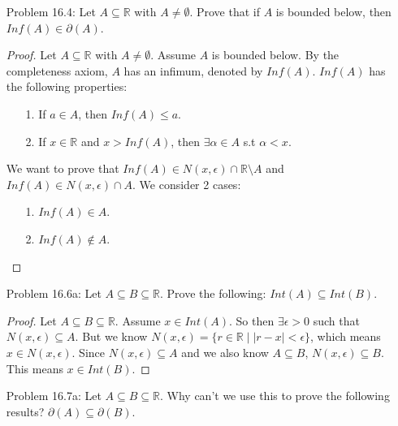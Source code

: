 \documentclass{article}
\theoremstyle{claim}
\theoremstyle{definition}
\begin{document}
\begin{enumerate}
\begin{enumerate}
\begin{proof}
                \end{proof}
            \item $Int(A) \subseteq A'$.
        \end{enumerate}
    \item[Problem 16.4:] Let $A \subseteq \mathbb{R}$ with $A \ne \emptyset$. Prove that if $A$ is bounded below, then $Inf(A) \in \partial(A)$.
        \begin{proof}
            Let $A \subseteq \mathbb{R}$ with $A \ne \emptyset$. Assume $A$ is bounded below. By the completeness axiom, $A$ has an infimum, denoted by $Inf(A)$. $Inf(A)$ has the following properties:
            \begin{enumerate}
                \item[1.] If $a \in A$, then $Inf(A) \le a$.
                \item[2.] If $x \in \mathbb{R}$ and $x > Inf(A)$, then $\exists \alpha \in A$ s.t $ \alpha < x$.
            \end{enumerate}
            We want to prove that $Inf(A) \in N(x, \epsilon) \cap \mathbb{R} \setminus A$ and $Inf(A) \in N(x, \epsilon) \cap A$. We consider 2 cases:
            \begin{enumerate}
                \item[1.] $Inf(A) \in A$.
                \item[2.] $Inf(A) \notin A$.
            \end{enumerate}
        \end{proof}
    \item[Problem 16.6a:] Let $A \subseteq B \subseteq \mathbb{R}$. Prove the following: $Int(A) \subseteq Int(B)$.
        \begin{proof}
            Let $A \subseteq B \subseteq \mathbb{R}$. Assume $x \in Int(A)$. So then $\exists \epsilon > 0$ such that $N(x, \epsilon) \subseteq A$. But we know $N(x, \epsilon) = \{ r \in \mathbb{R} \mid |r - x| < \epsilon\}$, which means $x \in N(x, \epsilon)$. Since $N(x, \epsilon) \subseteq A$ and we also know $A \subseteq B$, $N(x, \epsilon) \subseteq B$. This means $x \in Int(B)$.
        \end{proof}
    \item[Problem 16.7a:] Let $A \subseteq B \subseteq \mathbb{R}$. Why can't we use this to prove the following results? $\partial(A) \subseteq \partial(B)$.
\end{enumerate}
\end{document}

